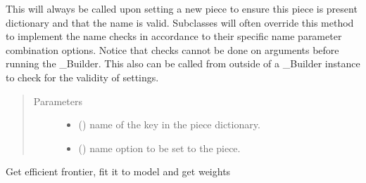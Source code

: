 \documentclass[letterpaper,10pt,english]{sphinxmanual}
\begin{document}
\begin{fulllineitems}
\begin{fulllineitems}
This will always be called upon setting a new piece to ensure this
piece is present dictionary and that the name is valid. Subclasses
will often override this method to implement the name checks in
accordance to their specific name parameter combination options.
Notice that checks cannot be done on arguments before running the
\_Builder. This also can be called from outside of a \_Builder instance
to check for the validity of settings.
\begin{quote}\begin{description}
\item[{Parameters}] \leavevmode\begin{itemize}
\item {} 
 () \textendash{} name of the key in the piece dictionary.

\item {} 
 () \textendash{} name option to be set to the piece.

\end{itemize}

\end{description}\end{quote}

\end{fulllineitems}


\begin{fulllineitems}
\label{\detokenize{dalio.pipe:dalio.pipe.builders.OptimumWeights.transform}}
Get efficient frontier, fit it to model and get weights

\end{fulllineitems}


\end{fulllineitems}

\end{document}
